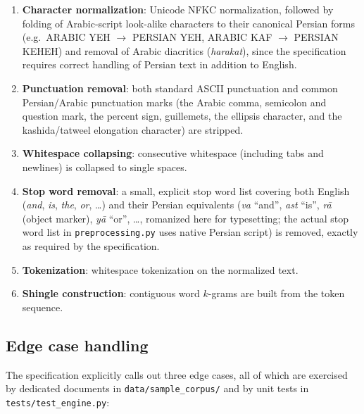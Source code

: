 \documentclass[11pt]{article}
\begin{document}
\begin{enumerate}[label=\arabic*.]
    \item \textbf{Character normalization}: Unicode NFKC normalization, followed by folding of
          Arabic-script look-alike characters to their canonical Persian forms (e.g.\ ARABIC YEH
          $\rightarrow$ PERSIAN YEH, ARABIC KAF $\rightarrow$ PERSIAN KEHEH) and removal of Arabic
          diacritics (\emph{harakat}), since the specification requires correct handling of Persian text
          in addition to English.
    \item \textbf{Punctuation removal}: both standard ASCII punctuation and common Persian/Arabic
          punctuation marks (the Arabic comma, semicolon and question mark, the percent sign, guillemets,
          the ellipsis character, and the kashida/tatweel elongation character) are stripped.
    \item \textbf{Whitespace collapsing}: consecutive whitespace (including tabs and newlines) is collapsed
          to single spaces.
    \item \textbf{Stop word removal}: a small, explicit stop word list covering both English (\emph{and},
          \emph{is}, \emph{the}, \emph{or}, \ldots) and their Persian equivalents (\emph{va} ``and'',
          \emph{ast} ``is'', \emph{r\={a}} (object marker), \emph{y\={a}} ``or'', \ldots, romanized here for
          typesetting; the actual stop word list in \verb|preprocessing.py| uses native Persian script) is
          removed, exactly as required by the specification.
    \item \textbf{Tokenization}: whitespace tokenization on the normalized text.
    \item \textbf{Shingle construction}: contiguous word $k$-grams are built from the token sequence.
\end{enumerate}

\subsection{Edge case handling}

The specification explicitly calls out three edge cases, all of which are exercised by dedicated
documents in \verb|data/sample_corpus/| and by unit tests in \verb|tests/test_engine.py|:
\end{document}
